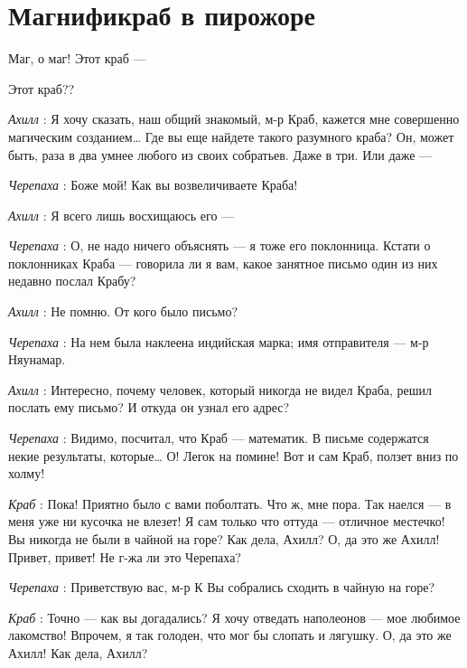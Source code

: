 \documentclass[../main.tex]{subfiles}
\begin{document}
\section{Магнификраб в пирожоре}


\begin{dialogue}

 Маг, о маг! Этот краб ---

 Этот краб??

\emph{Ахилл} : Я хочу сказать, наш общий знакомый, м-р Краб, кажется мне совершенно магическим созданием\ldots{} Где вы еще найдете такого разумного краба? Он, может быть, раза в два умнее любого из своих собратьев. Даже в три. Или даже ---

\emph{Черепаха} : Боже мой! Как вы возвеличиваете Краба!

\emph{Ахилл} : Я всего лишь восхищаюсь его ---

\emph{Черепаха} : О, не надо ничего объяснять --- я тоже его поклонница. Кстати о поклонниках Краба --- говорила ли я вам, какое занятное письмо один из них недавно послал Крабу?

\emph{Ахилл} : Не помню. От кого было письмо?

\emph{Черепаха} : На нем была наклеена индийская марка; имя отправителя --- м-р Няунамар.

\emph{Ахилл} : Интересно, почему человек, который никогда не видел Краба, решил послать ему письмо? И откуда он узнал его адрес?

\emph{Черепаха} : Видимо, посчитал, что Краб --- математик. В письме содержатся некие результаты, которые\ldots{} О! Легок на помине! Вот и сам Краб, ползет вниз по холму!

\emph{Краб} : Пока! Приятно было с вами поболтать. Что ж, мне пора. Так наелся --- в меня уже ни кусочка не влезет! Я сам только что оттуда --- отличное местечко! Вы никогда не были в чайной на горе? Как дела, Ахилл? О, да это же Ахилл! Привет, привет! Не г-жа ли это Черепаха?

\emph{Черепаха} : Приветствую вас, м-р К Вы собрались сходить в чайную на горе?

\emph{Краб} : Точно --- как вы догадались? Я хочу отведать наполеонов --- мое любимое лакомство! Впрочем, я так голоден, что мог бы слопать и лягушку. О, да это же Ахилл! Как дела, Ахилл?


\end{dialogue}
\end{document}
